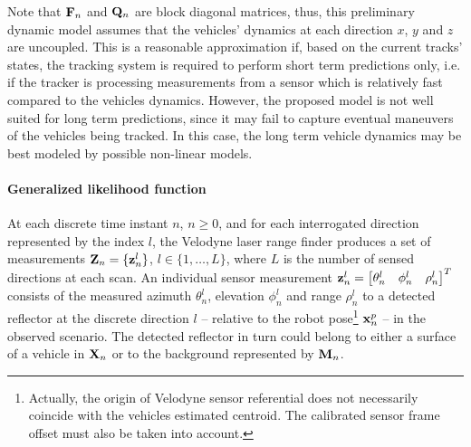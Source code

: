 \documentclass[letterpaper]{article}
\begin{document}
Note that $ {\bf F}_{n} $ and $ {\bf Q}_{n} $ are block diagonal matrices, thus, this preliminary dynamic model assumes that the vehicles' dynamics at each direction $ x $, $ y $ and $ z $ are uncoupled. This is a reasonable approximation if, based on the current tracks' states, the tracking system is required to perform short term predictions only, i.e. if the tracker is processing measurements from a sensor which is relatively fast compared to the vehicles dynamics. However, the proposed model is not well suited for long term predictions, since it may fail to capture eventual maneuvers of the vehicles being tracked. In this case, the long term vehicle dynamics may be best modeled by possible non-linear models.

\paragraph{Generalized likelihood function} At each discrete time instant $ n $, $ n \ge 0 $, and for each interrogated direction represented by the index $ l $, the Velodyne laser range finder produces a set of measurements $ {\bf Z}_{n} = \lbrace {\bf z}^{l}_{n} \rbrace $, $ l \in \lbrace 1, \ldots, L \rbrace $, where $ L $ is the number of sensed directions at each scan. An individual sensor measurement $ {\bf z}^{l}_{n} = \begin{bmatrix} \theta^{l}_{n} & \phi^{l}_{n} & \rho^{l}_{n} \end{bmatrix}^{T} $ consists of the measured azimuth $ \theta^{l}_{n} $, elevation $ \phi^{l}_{n} $ and range $ \rho^{l}_{n} $ to a detected reflector at the discrete direction $ l $ -- relative to the robot pose\footnote{Actually, the origin of Velodyne sensor referential does not necessarily coincide with the vehicles estimated centroid. The calibrated sensor frame offset must also be taken into account.} $ {\bf x}^{p}_{n} $ -- in the observed scenario. The detected reflector in turn could belong to either a surface of a vehicle in $ {\bf X}_{n} $ or to the background represented by $ {\bf M}_{n} $.
\end{document}
